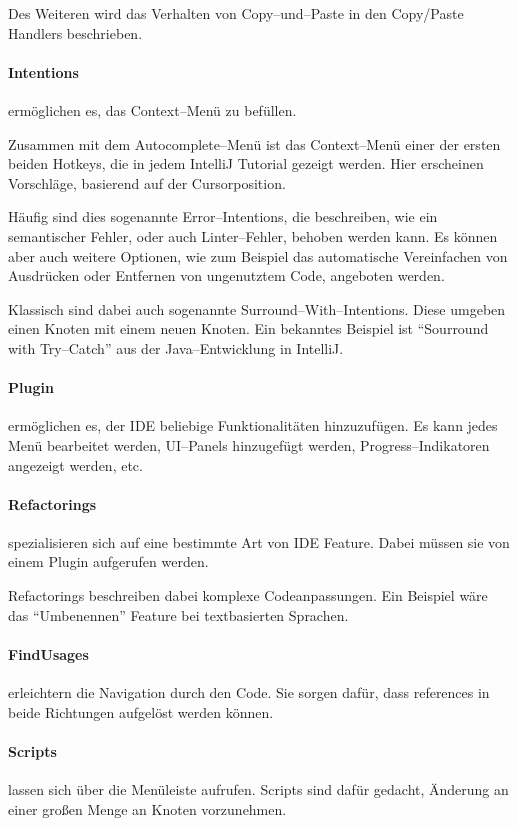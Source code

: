 Des Weiteren wird das Verhalten von Copy--und--Paste in den {\ttfamily Copy/Paste Handlers} beschrieben.

\paragraph{Intentions} ermöglichen es, das Context--Menü zu befüllen.

Zusammen mit dem Autocomplete--Menü ist das Context--Menü einer der ersten beiden Hotkeys, die in jedem IntelliJ Tutorial gezeigt werden.
Hier erscheinen Vorschläge, basierend auf der Cursorposition.

Häufig sind dies sogenannte Error--Intentions, die beschreiben, wie ein semantischer Fehler, oder auch Linter--Fehler, behoben werden kann.
Es können aber auch weitere Optionen, wie zum Beispiel das automatische Vereinfachen von Ausdrücken oder Entfernen von ungenutztem Code, angeboten werden.

Klassisch sind dabei auch sogenannte Surround--With--Intentions.
Diese umgeben einen Knoten mit einem neuen Knoten.
Ein bekanntes Beispiel ist \enquote{Sourround with Try--Catch} aus der Java--Entwicklung in IntelliJ\@.

\paragraph{Plugin} ermöglichen es, der \ac{IDE} beliebige Funktionalitäten hinzuzufügen.
Es kann jedes Menü bearbeitet werden, \ac{UI}--Panels hinzugefügt werden, Progress--Indikatoren angezeigt werden, etc.

\paragraph{Refactorings} spezialisieren sich auf eine bestimmte Art von \ac{IDE} Feature.
Dabei müssen sie von einem Plugin aufgerufen werden.

Refactorings beschreiben dabei komplexe Codeanpassungen.
Ein Beispiel wäre das \enquote{Umbenennen} Feature bei textbasierten Sprachen.

\paragraph{FindUsages} erleichtern die Navigation durch den Code.
Sie sorgen dafür, dass {\ttfamily references} in beide Richtungen aufgelöst werden können.

\paragraph{Scripts} lassen sich über die Menüleiste aufrufen.
Scripts sind dafür gedacht, Änderung an einer großen Menge an Knoten vorzunehmen.

